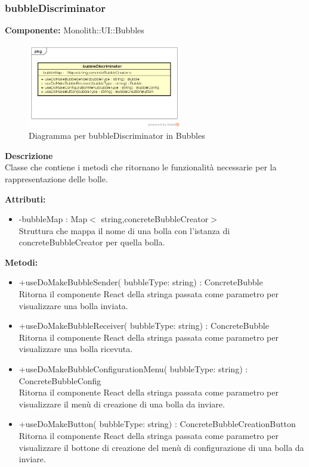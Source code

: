 \subsubsection{bubbleDiscriminator}
\textbf{Componente:}  Monolith::UI::Bubbles\\
   \FloatBarrier
   \begin{figure}[ht]
   \centering
   \includegraphics[width=0.6\textwidth]{img/single-bubbleDiscriminator}
   \caption{{Diagramma per bubbleDiscriminator in Bubbles}}
\end{figure}
\FloatBarrier
\textbf{Descrizione}\\
Classe che contiene i metodi che ritornano le funzionalità necessarie per la rappresentazione delle bolle.

\textbf{Attributi:}
\begin{itemize}\item -bubbleMap : Map$<$ string,concreteBubbleCreator$>$ \\Struttura che mappa il nome di una bolla con l'istanza di concreteBubbleCreator per quella bolla.\end{itemize}
\textbf{Metodi:} \begin{itemize}\item +useDoMakeBubbleSender( bubbleType: string) : ConcreteBubble \\Ritorna il componente React della stringa passata come parametro per visualizzare una bolla inviata.\item +useDoMakeBubbleReceiver( bubbleType: string) : ConcreteBubble \\Ritorna il componente React della stringa passata come parametro per visualizzare una bolla ricevuta.\item +useDoMakeBubbleConfigurationMenu( bubbleType: string) : ConcreteBubbleConfig \\Ritorna il componente React della stringa passata come parametro per visualizzare il menù di creazione di una bolla da inviare.\item  +useDoMakeButton( bubbleType: string) : ConcreteBubbleCreationButton \\ Ritorna il componente React della stringa passata come parametro per visualizzare il bottone di creazione del menù di configurazione di una bolla da inviare.

\end{itemize} 


